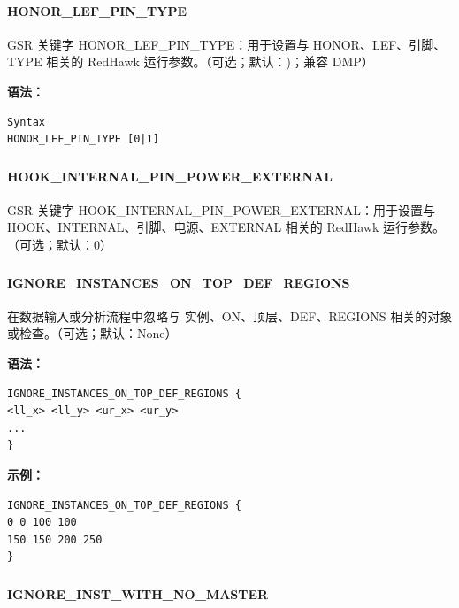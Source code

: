 \paragraph*{HONOR_LEF_PIN_TYPE}

GSR 关键字 HONOR_LEF_PIN_TYPE：用于设置与 HONOR、LEF、引脚、TYPE 相关的 RedHawk 运行参数。（可选；默认：)；兼容 DMP）

\textbf{语法：}
\begin{lstlisting}
Syntax
HONOR_LEF_PIN_TYPE [0|1]
\end{lstlisting}

\subsubsection{}
\paragraph*{HOOK_INTERNAL_PIN_POWER_EXTERNAL}

GSR 关键字 HOOK_INTERNAL_PIN_POWER_EXTERNAL：用于设置与 HOOK、INTERNAL、引脚、电源、EXTERNAL 相关的 RedHawk 运行参数。（可选；默认：0）

\subsubsection{}
\paragraph*{IGNORE_INSTANCES_ON_TOP_DEF_REGIONS}

在数据输入或分析流程中忽略与 实例、ON、顶层、DEF、REGIONS 相关的对象或检查。（可选；默认：None）

\textbf{语法：}
\begin{lstlisting}
IGNORE_INSTANCES_ON_TOP_DEF_REGIONS {
<ll_x> <ll_y> <ur_x> <ur_y>
...
}
\end{lstlisting}

\textbf{示例：}
\begin{lstlisting}
IGNORE_INSTANCES_ON_TOP_DEF_REGIONS {
0 0 100 100
150 150 200 250
}
\end{lstlisting}

\subsubsection{}
\paragraph*{IGNORE_INST_WITH_NO_MASTER}

